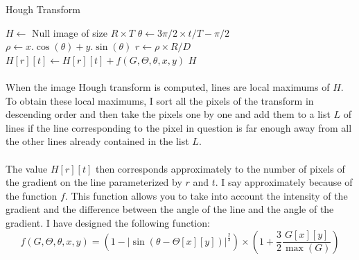 \documentclass[11pt]{article}
\begin{document}
	\begin{algorithm}[h]
		\caption{Hough Transform}
		\label{alg:hough}
		\begin{algorithmic}
			\State $H \gets $ Null image of size $R \times T$
			\For{$(x, y) \in [0, W) \times [0; H) $ with $ G[x][y] > 0$}
				\For{$t \in [0; T)$}
					\State $\theta \gets 3 \pi / 2 \times t / T - \pi / 2$
					\State $\rho \gets x . \cos(\theta) + y . \sin(\theta)$
						\State $r \gets \rho \times R / D$
						\State $H[r][t] \gets H[r][t] + f(G, \Theta, \theta, x, y)$
					\EndIf
				\EndFor
			\EndFor
			\State \Return $H$
			\EndFunction
		\end{algorithmic}
	\end{algorithm}

	\paragraph{}
	When the image Hough transform is computed, lines are local maximums of $H$. To obtain these local maximums, I sort all the pixels of the transform in descending order and then take the pixels one by one and add them to a list $L$ of lines if the line corresponding to the pixel in question is far enough away from all the other lines already contained in the list $L$.
	
	\paragraph{}
	The value $H[r][t]$ then corresponds approximately to the number of pixels of the gradient on the line parameterized by $r$ and $t$. I say approximately because of the function $f$. This function allows you to take into account the intensity of the gradient and the difference between the angle of the line and the angle of the gradient. I have designed the following function:
	$$ f(G, \Theta, \theta, x, y) = \left( 1 - \left| \sin \left( \theta - \Theta[x][y] \right) \right|^{\frac{2}{3}}\right) \times \left( 1 + \frac{3}{2} \dfrac{G[x][y]}{\max (G)} \right) $$
	
\end{document}
